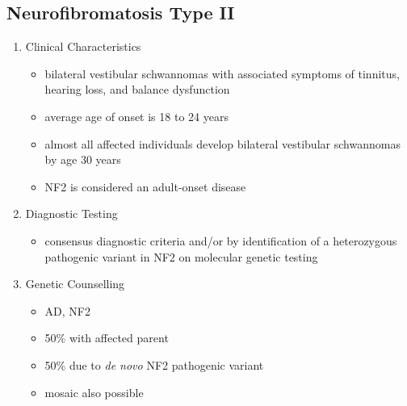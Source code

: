 \documentclass[12pt]{scrartcl}
\begin{document}
\subsection{Neurofibromatosis Type II}
\label{sec:orgf8ff650}
\begin{enumerate}
\item Clinical Characteristics
\label{sec:org0d4d37c}
\begin{itemize}
\item bilateral vestibular schwannomas with associated symptoms of tinnitus, hearing loss, and balance dysfunction
\item average age of onset is 18 to 24 years
\item almost all affected individuals develop bilateral vestibular
schwannomas by age 30 years
\item NF2 is considered an adult-onset disease
\end{itemize}
\item Diagnostic Testing
\label{sec:org390ed2e}
\begin{itemize}
\item consensus diagnostic criteria and/or by identification of a
heterozygous pathogenic variant in NF2 on molecular genetic testing
\end{itemize}

\item Genetic Counselling
\label{sec:org6a71cd9}
\begin{itemize}
\item AD, NF2
\item 50\% with affected parent
\item 50\% due to \emph{de novo} NF2 pathogenic variant
\item mosaic also possible
\end{itemize}
\end{enumerate}
\end{document}

